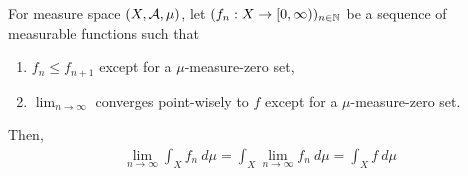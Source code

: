 \documentclass[11pt]{article}
\numberwithin{equation}{section}
\begin{document}
	\begin{theorem}
		For measure space $(X, \mathcal{{A}}, \mu)$, let $(f_n: X \to [0,\infty))_{n \in \mathbb{N}}$ be a sequence of measurable functions such that
		\begin{enumerate}
			\item $f_{n} \leq f_{n+1}$ except for a $\mu$-measure-zero set,
			\item $\lim_{n\to\infty}$ converges point-wisely to $f$ except for a $\mu$-measure-zero set.
		\end{enumerate}
		Then,
		\begin{align}
			\lim_{n \to \infty} \int_X f_n\ d\mu = \int_X \lim_{n \to \infty} f_n\ d\mu = \int_X f\ d\mu
		\end{align}
	\end{theorem}
	
\end{document}
